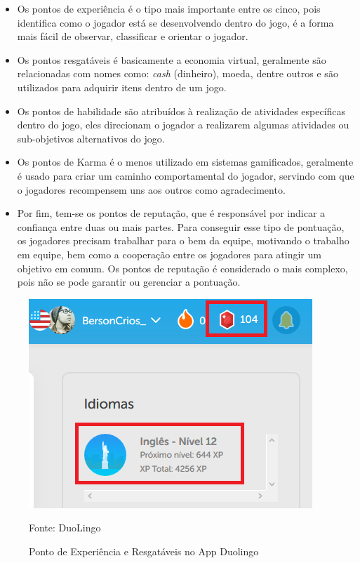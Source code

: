 		\begin{itemize}
			\item Os pontos de experiência é o tipo mais importante entre os cinco, pois identifica como o jogador está se desenvolvendo dentro do jogo, é a forma mais fácil de observar, classificar e orientar o jogador.
			
			\item Os pontos resgatáveis é basicamente a economia virtual, geralmente são relacionadas com nomes como: \textit{cash} (dinheiro), moeda, dentre outros e são utilizados  para adquirir itens dentro de um jogo.
			
			\item Os pontos de habilidade são atribuídos à realização de atividades específicas dentro do jogo, eles direcionam o jogador a realizarem algumas atividades ou sub-objetivos alternativos do jogo.
			
			\item Os pontos de Karma é o menos utilizado em sistemas gamificados, geralmente é usado para criar um caminho comportamental do jogador, servindo com que o jogadores recompensem uns aos outros como agradecimento.
			
			\item Por fim, tem-se os pontos de reputação, que é responsável por indicar  a confiança entre duas ou mais partes. Para conseguir esse tipo de pontuação, os jogadores precisam trabalhar para o bem da equipe, motivando o trabalho em equipe, bem como a cooperação entre os jogadores para atingir um objetivo em comum. Os pontos de reputação é considerado o mais complexo, pois não se pode garantir ou gerenciar a pontuação.
		\end{itemize}
		
		\begin{figure}[H]
			\centering
			\includegraphics[width=0.5\linewidth]{img/pontosDuoLinguo}
			\caption{Ponto de Experiência e Resgatáveis no App Duolingo}
			Fonte: DuoLingo
			\label{duolingoapp}
		\end{figure}

